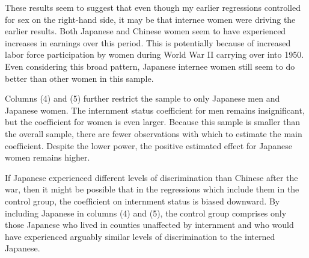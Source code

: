 

These results seem to suggest that even though my earlier regressions
controlled for sex on the right-hand side,
it may be that internee women were driving the earlier results.
Both Japanese and Chinese women seem to have experienced increases in earnings
over this period.
This is potentially because of increased labor force participation by women
during World War II carrying over into 1950.
Even considering this broad pattern,
Japanese internee women still seem to do better than other women in this sample.

Columns (4) and (5) further restrict the sample to only Japanese men
and Japanese women.
The internment status coefficient for men remains insignificant,
but the coefficient for women is even larger.
Because this sample is smaller than the overall sample,
there are fewer observations with which to estimate the main coefficient.
Despite the lower power, the positive estimated effect for Japanese women remains higher.

If Japanese experienced different levels of discrimination 
than Chinese after the war,
then it might be possible that in the regressions 
which include them in the control group,
the coefficient on internment status is biased downward.
By including Japanese in columns (4) and (5),
the control group comprises only those Japanese 
who lived in counties unaffected by internment
and who would have experienced arguably similar levels of discrimination
to the interned Japanese.
